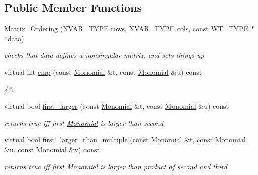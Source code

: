 \subsection*{Public Member Functions}
\begin{DoxyCompactItemize}
\item 
\mbox{\label{class_matrix___ordering_a59c24eeefe79a784f51253dcd0a51101}} 
\hyperlink{class_matrix___ordering_a59c24eeefe79a784f51253dcd0a51101}{Matrix\+\_\+\+Ordering} (N\+V\+A\+R\+\_\+\+T\+Y\+PE rows, N\+V\+A\+R\+\_\+\+T\+Y\+PE cols, const W\+T\+\_\+\+T\+Y\+PE $\ast$$\ast$data)
\begin{DoxyCompactList}\small\item\em checks that {\ttfamily data} defines a nonsingular matrix, and sets things up \end{DoxyCompactList}\item 
virtual int \hyperlink{class_matrix___ordering_a8a6423a305facdaf91a1a3921e0b9f73}{cmp} (const \hyperlink{class_monomial}{Monomial} \&t, const \hyperlink{class_monomial}{Monomial} \&u) const
\begin{DoxyCompactList}\small\item\em \{@ \end{DoxyCompactList}\item 
\mbox{\label{class_matrix___ordering_a7970faf2efb65ed656b2457cb5d5ff55}} 
virtual bool \hyperlink{class_matrix___ordering_a7970faf2efb65ed656b2457cb5d5ff55}{first\+\_\+larger} (const \hyperlink{class_monomial}{Monomial} \&t, const \hyperlink{class_monomial}{Monomial} \&u) const
\begin{DoxyCompactList}\small\item\em returns {\ttfamily true} iff first \hyperlink{class_monomial}{Monomial} is larger than second \end{DoxyCompactList}\item 
\mbox{\label{class_matrix___ordering_a88c97b82660708cd10a1ccae69057e09}} 
virtual bool \hyperlink{class_matrix___ordering_a88c97b82660708cd10a1ccae69057e09}{first\+\_\+larger\+\_\+than\+\_\+multiple} (const \hyperlink{class_monomial}{Monomial} \&t, const \hyperlink{class_monomial}{Monomial} \&u, const \hyperlink{class_monomial}{Monomial} \&v) const
\begin{DoxyCompactList}\small\item\em returns {\ttfamily true} iff first \hyperlink{class_monomial}{Monomial} is larger than product of second and third \end{DoxyCompactList}\item 
$$
\end{DoxyCompactItemize}
